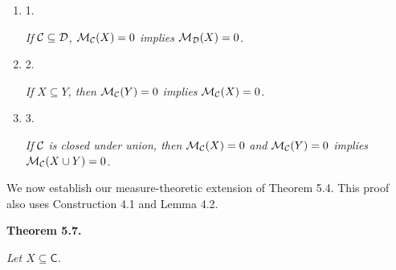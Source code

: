 \documentclass[10pt,a4paper]{article}
\begin{document}
\begin{enumerate}


\item[] 
1. 


\emph{If }${\cal C}\subseteq{\cal D}$\emph{, }${{\cal M}_{{\cal C}}}(X)=0$\emph{ implies }${{\cal M}_{{\cal D}}}(X)=0$\emph{.}\par





\item[] 
2. 


\emph{If }$X\subseteq Y$\emph{, then }${{\cal M}_{{\cal C}}}(Y)=0$\emph{ implies }${{\cal M}_{{\cal C}}}(X)=0$\emph{.}\par





\item[] 
3. 


\emph{If }${\cal C}$\emph{ is closed under union, then }${{\cal M}_{{\cal C}}}(X)=0$\emph{ and }${{\cal M}_{{\cal C}}}(Y)=0$\emph{ implies }${{\cal M}_{{\cal C}}}(X\cup Y)=0$\emph{.}\par





\end{enumerate}






We now establish our measure-theoretic extension of Theorem 5.4. This proof also uses Construction 4.1 and Lemma 4.2.\par





\par\medskip\noindent\textbf{
\textbf{Theorem 5.7}\textbf{.}
}\par



\emph{Let $X\subseteq\mathsf{C}$.}\par
\end{document}
